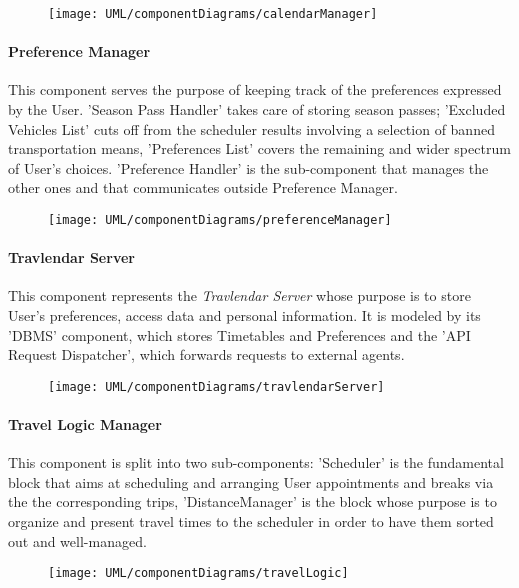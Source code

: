 	\begin{figure}[H]
		\centering
		\texttt{[image: UML/componentDiagrams/calendarManager]}
	\end{figure}
 

\paragraph{Preference Manager}
	This component serves the purpose of keeping track of the preferences expressed by the User. 'Season Pass Handler' takes care of storing season passes; 'Excluded Vehicles List' cuts off from the scheduler results involving a selection of banned transportation means, 'Preferences List' covers the remaining and wider spectrum of User's choices. 'Preference Handler' is the sub-component that manages the other ones and that communicates outside Preference Manager.

	\begin{figure}[H]
		\centering
		\texttt{[image: UML/componentDiagrams/preferenceManager]}
	\end{figure}
	

\paragraph{Travlendar Server} 
	This component represents the \textit{Travlendar Server} whose purpose is to store User's preferences, access data and personal information. It is modeled by its 'DBMS' component, which stores Timetables and Preferences and the 'API Request Dispatcher', which forwards requests to external agents.

	\begin{figure}[H]
		\centering
		\texttt{[image: UML/componentDiagrams/travlendarServer]}
	\end{figure}
	

\paragraph{Travel Logic Manager}
	This component is split into two sub-components: 'Scheduler' is the fundamental block that aims at scheduling and arranging User appointments and breaks via the the corresponding trips, 'DistanceManager' is the block whose purpose is to organize and present travel times to the scheduler in order to have them sorted out and well-managed.

	\begin{figure}[H]
		\centering
		\texttt{[image: UML/componentDiagrams/travelLogic]}
	\end{figure}
	

